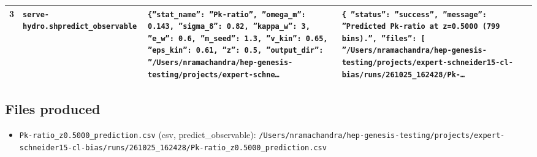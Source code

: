 \documentclass[11pt,a4paper]{article}
\begin{document}
\begin{longtable}{@{}p{}p{}p{}p{}@{}}
3 & \texttt{serve-hydro.sh}\newline\texttt{predict\_\allowbreak{}observable} & \texttt{\{''stat\_\allowbreak{}name'':\allowbreak{} ''Pk-ratio'',\allowbreak{} ''omega\_\allowbreak{}m'':\allowbreak{} 0.143,\allowbreak{} ''sigma\_\allowbreak{}8'':\allowbreak{} 0.82,\allowbreak{} ''kappa\_\allowbreak{}w'':\allowbreak{} 3,\allowbreak{} ''e\_\allowbreak{}w'':\allowbreak{} 0.6,\allowbreak{} ''m\_\allowbreak{}seed'':\allowbreak{} 1.3,\allowbreak{} ''v\_\allowbreak{}kin'':\allowbreak{} 0.65,\allowbreak{} ''eps\_\allowbreak{}kin'':\allowbreak{} 0.61,\allowbreak{} ''z'':\allowbreak{} 0.5,\allowbreak{} ''output\_\allowbreak{}dir'':\allowbreak{} ''/\allowbreak{}Users/\allowbreak{}nramachandra/\allowbreak{}hep-genesis-testing/\allowbreak{}projects/\allowbreak{}expert-schne\ldots{}\allowbreak{}} & \texttt{\{   ''status'':\allowbreak{} ''success'',\allowbreak{}   ''message'':\allowbreak{} ''Predicted Pk-ratio at z=\allowbreak{}0.5000 (799 bins)\allowbreak{}.'',\allowbreak{}   ''files'':\allowbreak{} [     ''/\allowbreak{}Users/\allowbreak{}nramachandra/\allowbreak{}hep-genesis-testing/\allowbreak{}projects/\allowbreak{}expert-schneider15-cl-bias/\allowbreak{}runs/\allowbreak{}261025\_\allowbreak{}162428/\allowbreak{}Pk-\ldots{}\allowbreak{}} \\
\bottomrule\end{longtable}
\subsection{Files produced}
\begin{itemize}
  \item \texttt{Pk-ratio\_\allowbreak{}z0.5000\_\allowbreak{}prediction.csv} (csv, predict\_observable): \texttt{/\allowbreak{}Users/\allowbreak{}nramachandra/\allowbreak{}hep-genesis-testing/\allowbreak{}projects/\allowbreak{}expert-schneider15-cl-bias/\allowbreak{}runs/\allowbreak{}261025\_\allowbreak{}162428/\allowbreak{}Pk-ratio\_\allowbreak{}z0.5000\_\allowbreak{}prediction.csv}
\end{itemize}
\end{document}
